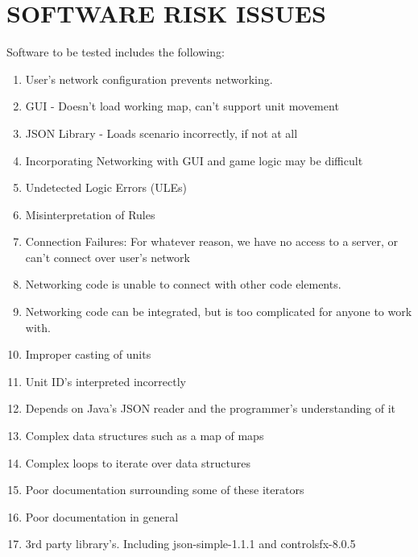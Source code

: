 {\section[SOFTWARE RISK ISSUES]{\bfseries\color{black} SOFTWARE RISK ISSUES}
{\color{black}
Software to be tested includes the following:

\begin{enumerate}
\item User's network configuration prevents networking.
\item  GUI - Doesn't load working map, can't support unit movement
\item  JSON Library - Loads scenario incorrectly, if not at all
\item  Incorporating Networking with GUI and game logic may be difficult
\item  Undetected Logic Errors (ULEs)
\item  Misinterpretation of Rules
\item  Connection Failures: For whatever reason, we have no access to a server, or can't connect over user's network
\item  Networking code is unable to connect with other code elements.
\item  Networking code can be integrated, but is too complicated for anyone to work with.
\item Improper casting of units
\item Unit ID's interpreted incorrectly
\item Depends on Java's JSON reader and the programmer's understanding of it
\item Complex data structures such as a map of maps
\item Complex loops to iterate over data structures
\item Poor documentation surrounding some of these iterators
\item Poor documentation in general
\item 3rd party library's. Including json-simple-1.1.1 and controlsfx-8.0.5
\end{enumerate}
}
}


